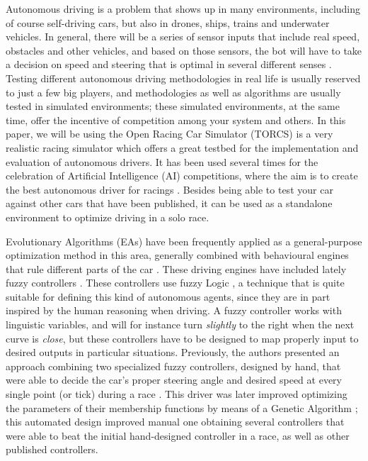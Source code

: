 \documentclass[conference]{IEEEtran}
\begin{document}
Autonomous driving is a problem that shows up in many environments,
including of course self-driving cars, but also in drones, ships,
trains and underwater vehicles. In general, there will be a series of
sensor inputs that include real speed, obstacles and other vehicles,
and based on those sensors, the bot will have to take a decision on
speed and steering that is optimal in several different
senses \cite{Autodriv2006}. Testing different autonomous driving methodologies in real life is usually reserved to just a few big players, and methodologies
as well as algorithms are usually tested in simulated environments;
these simulated environments, at the same time, offer the incentive of
competition among your system and others. In this paper, we will be
using the Open Racing Car Simulator (TORCS) \cite{WebTORCS} is a very
realistic racing simulator which offers a great testbed for the
implementation and evaluation of autonomous drivers.  
It has been used several times for the celebration of Artificial
Intelligence (AI) competitions, where the aim is to create the best
autonomous driver for racings
\cite{torcs5,manualTORCS,Torcs3,torcs7,oponnents2010}. Besides being
able to test your car against other cars that have been published, it
can be used as a standalone environment to optimize driving in a
solo race. 

Evolutionary Algorithms (EAs) \cite{EAs_Back96} have been frequently
applied as a general-purpose optimization method in this area,
generally combined with behavioural engines that rule different parts
of the car
\cite{Floreano2004,CarRacing_Pelta09,SAES2012,QuadfliegMO,torcs2012}. These
driving engines have included lately fuzzy controllers
\cite{Guadarrama2008, LFAG, PerezEvolvingFuzzy09}. These controllers
use fuzzy Logic \cite{Fuzzy2011}, a  technique that is quite suitable
for defining this kind of autonomous agents, since they are in part
inspired by the human reasoning when driving. A fuzzy controller works
with linguistic variables, and will for instance turn {\em slightly}
to the right when the next curve is {\em close}, but these controllers
have to be designed to map properly input to desired outputs in
particular situations. Previously, the authors presented an approach
combining two specialized fuzzy controllers, designed by hand, that
were able to decide the car's proper steering angle and desired speed
at every single point (or tick) during a race \cite{evo17}. This
driver was later improved \cite{evo18} optimizing the parameters of
their membership functions by means of a Genetic Algorithm
\cite{GAs_Goldberg89}; this automated design improved manual one
obtaining several controllers that were able to beat the initial
hand-designed controller in a race, as well as other published
controllers. 
\end{document}
